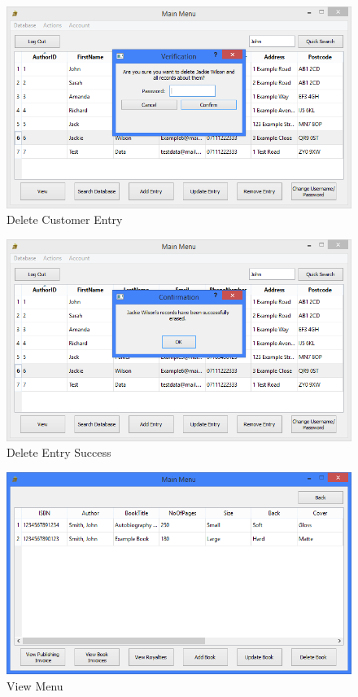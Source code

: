 \begin{figure}[H]
    \caption{Delete Customer Entry} \label{fig:DeleteEntry}
    \includegraphics[width=\textwidth]{./Maintenance/UserInterface/DeleteEntry.png}
\end{figure}

\begin{figure}[H]
    \caption{Delete Entry Success} \label{fig:DeleteEntrySuccess}
    \includegraphics[width=\textwidth]{./Maintenance/UserInterface/DeleteEntrySuccess.png}
\end{figure}

\begin{figure}[H]
    \caption{View Menu} \label{fig:ViewMenu}
    \includegraphics[width=\textwidth]{./Maintenance/UserInterface/ViewMenu.png}
\end{figure}

